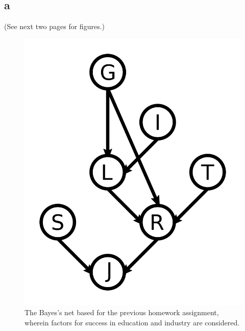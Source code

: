 \documentclass{article}
\begin{document}
\subsection{a}

(See next two pages for figures.)

\begin{figure}
	\centering
	\includegraphics[width=120mm]{figs/education-bayess-net.png}
	\caption{The Bayes's net based for the previous homework assignment, wherein
        factors for success in education and industry are considered.}
\end{figure}
\end{document}
